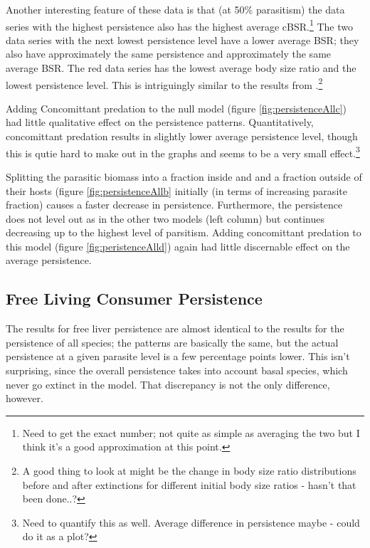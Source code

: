 \documentclass[11pt]{amsart}
\begin{document}
Another interesting feature of these data is that (at 50\% parasitism) the data series with the highest persistence also has the highest average cBSR.\footnote{Need to get the exact number; not quite as simple as averaging the two but I think it's a good approximation at this point.}  The two data series with the next lowest persistence level have a lower average BSR; they also have approximately the same persistence and approximately the same average BSR.  The red data series has the lowest average body size ratio and the lowest persistence level.  This is intriguingly similar to the results from \cite{Brose2006}.\footnote{A good thing to look at might be the change in body size ratio distributions before and after extinctions for different initial body size ratios - hasn't that been done..?}

Adding Concomittant predation to the null model (figure \ref{fig:persistenceAllc}) had little qualitative effect on the persistence patterns.  Quantitatively, concomittant predation results in slightly lower average persistence level, though this is qutie hard to make out in the graphs and seems to be a very small effect.\footnote{Need to quantify this as well.  Average difference in persistence maybe - could do it as a plot?}

Splitting the parasitic biomass into a fraction inside and and a fraction outside of their hosts (figure \ref{fig:persistenceAllb} initially (in terms of increasing parasite fraction) causes a faster decrease in persistence.  
Furthermore, the persistence does not level out as in the other two models (left column) but continues decreasing up to the highest level of parsitism.  Adding concomittant predation to this model (figure \ref{fig:peristenceAlld}) again had little discernable effect on the average persistence.

\subsection{Free Living Consumer Persistence \label{sec:persistenceFree}}

The results for free liver persistence are almost identical to the results for the persistence of all species; the patterns are basically the same, but the actual persistence at a given parasite level is a few percentage points lower.  This isn't surprising, since the overall persistence takes into account basal species, which never go extinct in the model.  That discrepancy is not the only difference, however.
\end{document}
